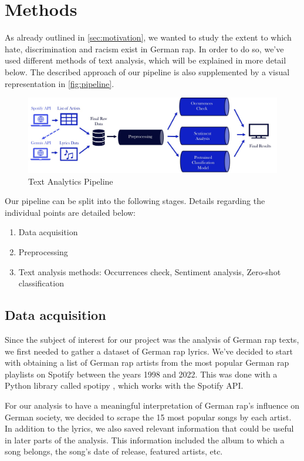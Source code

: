\section{Methods}\label{sec:project}

As already outlined in \autoref{sec:motivation}, we wanted to study the extent to which hate, discrimination and racism exist in German rap. In order to do so, we've used different methods of text analysis, which will be explained in more detail below. The described approach of our pipeline is also supplemented by a visual representation in \autoref{fig:pipeline}.

\begin{figure}[!htb]
  \centering
  \includegraphics[width=\textwidth]{figures/pipeline.jpg}
  \caption[]{Text Analytics Pipeline}
  \label{fig:pipeline}
  \end{figure}

  Our pipeline can be split into the following stages. Details regarding the individual points are detailed below:
  \begin{enumerate}
    \item Data acquisition
    \item Preprocessing
    \item Text analysis methods: Occurrences check, Sentiment analysis, Zero-shot classification
  \end{enumerate}

\subsection*{Data acquisition}

Since the subject of interest for our project was the analysis of German rap texts, we first needed to gather a dataset of German rap lyrics. We've decided to start with obtaining a list of German rap artists from the most popular German rap playlists on Spotify between the years 1998 and 2022. This was done with a Python library called spotipy \cite{spotipy}, which works with the Spotify API.

For our analysis to have a meaningful interpretation of German rap's influence on German society, we decided to scrape the 15 most popular songs by each artist. In addition to the lyrics, we also saved relevant information that could be useful in later parts of the analysis. This information included the album to which a song belongs, the song's date of release, featured artists, etc.

